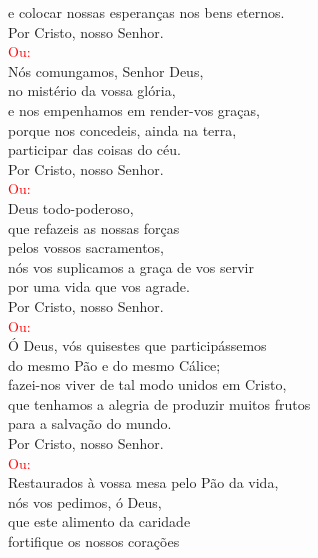 \documentclass{book}
\begin{document}
\begin{flushleft}
    e colocar nossas esperanças nos bens eternos. \\
    Por Cristo, nosso Senhor.
    \vspace{.1cm} \\
    \textcolor{red}{Ou:}
    \vspace{.1cm} \\
    Nós comungamos, Senhor Deus, \\
    no mistério da vossa glória, \\
    e nos empenhamos em render-vos graças, \\
    porque nos concedeis, ainda na terra, \\
    participar das coisas do céu. \\
    Por Cristo, nosso Senhor.
    \vspace{.1cm} \\
    \textcolor{red}{Ou:}
    \vspace{.1cm} \\
    Deus todo-poderoso, \\
    que refazeis as nossas forças \\
    pelos vossos sacramentos, \\
    nós vos suplicamos a graça de vos servir \\
    por uma vida que vos agrade. \\
    Por Cristo, nosso Senhor.
    \vspace{.1cm} \\
    \textcolor{red}{Ou:}
    \vspace{.1cm} \\
    Ó Deus, vós quisestes que participássemos \\
    do mesmo Pão e do mesmo Cálice; \\
    fazei-nos viver de tal modo unidos em Cristo, \\
    que tenhamos a alegria de produzir muitos frutos \\
    para a salvação do mundo. \\
    Por Cristo, nosso Senhor.
    \vspace{.1cm} \\
    \textcolor{red}{Ou:}
    \vspace{.1cm} \\
    Restaurados à vossa mesa pelo Pão da vida, \\
    nós vos pedimos, ó Deus, \\
    que este alimento da caridade \\
    fortifique os nossos corações \\

\end{flushleft}
\end{document}
